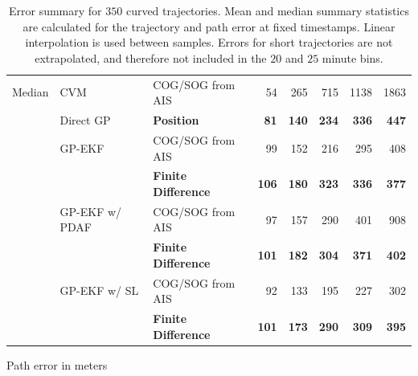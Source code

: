 \begin{table}[b]
\begin{subtable}{\textwidth}
{\begin{tabular}{lllrrrrr}
                \hline
                Median  & CVM            & COG/SOG from AIS       & 54       & 265      & 715     & 1138    & 1863     \\
                        & Direct GP      & \bf Position           & \bf 81   & \bf 140  & \bf 234 & \bf 336 & \bf 447  \\
                        & GP-EKF         & COG/SOG from AIS       & 99       & 152      & 216     & 295     & 408      \\
                        &                & \bf Finite Difference  & \bf 106  & \bf 180  & \bf 323 & \bf 336 & \bf  377 \\
                        & GP-EKF w/ PDAF & COG/SOG from AIS       & 97       & 157      & 290     & 401     & 908      \\
                        &                & \bf  Finite Difference & \bf  101 & \bf  182 & \bf 304 & \bf 371 & \bf 402  \\
                        & GP-EKF w/ SL   & COG/SOG from AIS       & 92       & 133      & 195     & 227     & 302      \\
                        &                & \bf  Finite Difference & \bf 101  & \bf 173  & \bf 290 & \bf 309 & \bf 395  \\
                \bottomrule
            \end{tabular}
        }
        \caption{Path error in meters}
        \label{table:stats_curved_path_err}
    \end{subtable}
    \caption{Error summary for $350$ curved trajectories. Mean and median summary statistics are calculated for the trajectory and path error at fixed timestamps. Linear interpolation is used between samples. Errors for short trajectories are not extrapolated, and therefore not included in the $20$ and $25$ minute bins.}
    \label{table:stats_curved_error}
\end{table}